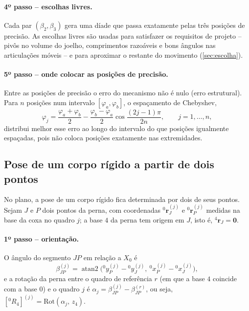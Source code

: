 \documentclass[12pt,a4paper,twoside]{article}
\newcommand{\rv}[2]{{}^{#1}\mathbf{r}_{#2}}          %
\newcommand{\Rm}[2]{[{}^{#1}R_{#2}]}                 %
\newcommand{\Rot}[2]{\mathrm{Rot}(#1,\,#2)}
\numberwithin{equation}{section}
\begin{document}
\paragraph{4º passo -- escolhas livres.} Cada par $(\beta_2, \beta_3)$ gera uma díade que passa
exatamente pelas três posições de precisão. As escolhas livres são usadas para satisfazer os
requisitos de projeto -- pivôs no volume do joelho, comprimentos razoáveis e bons ângulos nas
articulações móveis -- e para aproximar o restante do movimento (\cref{sec:escolha}).

\paragraph{5º passo -- onde colocar as posições de precisão.} Entre as posições de precisão o
erro do mecanismo não é nulo (erro estrutural). Para $n$ posições num intervalo
$[\varphi_a, \varphi_b]$, o espaçamento de Chebyshev,
\begin{equation}
  \varphi_j = \frac{\varphi_a + \varphi_b}{2} - \frac{\varphi_b - \varphi_a}{2}\cos\frac{(2j-1)\pi}{2n},
  \qquad j = 1, \dots, n,
  \label{eq:chebyshev}
\end{equation}
distribui melhor esse erro ao longo do intervalo do que posições igualmente espaçadas, pois
não coloca posições exatamente nas extremidades.

\subsection{Pose de um corpo rígido a partir de dois pontos}\label{sec:pose2pontos}

No plano, a pose de um corpo rígido fica determinada por dois de seus pontos. Sejam $J$ e
$P$ dois pontos da perna, com coordenadas $\rv{0}{J}^{(j)}$ e $\rv{0}{P}^{(j)}$ medidas na base da
coxa no quadro $j$; a base $4$ da perna tem origem em $J$, isto é, $\rv{4}{J} = \mathbf 0$.

\paragraph{1º passo -- orientação.} O ângulo do segmento $JP$ em relação a $X_0$ é
\begin{equation}
  \beta_{JP}^{(j)} = \operatorname{atan2}\big({}^0y_P^{(j)} - {}^0y_J^{(j)},\ {}^0x_P^{(j)} - {}^0x_J^{(j)}\big),
\end{equation}
e a rotação da perna entre o quadro de referência $r$ (em que a base $4$ coincide com a
base $0$) e o quadro $j$ é $\alpha_j = \beta_{JP}^{(j)} - \beta_{JP}^{(r)}$, ou seja,
$\Rm{0}{4}^{(j)} = \Rot{\alpha_j}{z_4}$.
\end{document}
